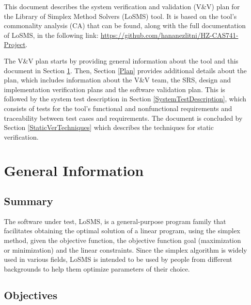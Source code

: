 \documentclass[12pt, titlepage]{article}
\newcommand{\famname}{LoSMS} %
\begin{document}
\listoffigures


\newpage


This document describes the system verification and validation (V\&V) plan for
the Library of Simplex Method Solvers (\famname{}) tool.   It is based on the tool's commonality analysis
(CA) that can be found, along with the full documentation of \famname{}, in the
following link: \url{https://github.com/hananezlitni/HZ-CAS741-Project}.

The V\&V plan starts by providing general information about the tool and this 
document in Section \ref{GeneralInfo}. Then, Section \ref{Plan} provides 
additional details about the plan, which includes information about the V\&V 
team, the SRS, design and implementation verification plans and the software 
validation plan. This is followed by the system test description in Section 
\ref{SystemTestDescription}, which consists of tests for the tool's functional 
and nonfunctional requirements and traceability between test cases and 
requirements. The document is concluded by Section \ref{StaticVerTechniques} 
which describes the techniques for static verification.

\section{General Information} \label{GeneralInfo}

\subsection{Summary}

The software under test, \famname{}, is a general-purpose program family that 
facilitates obtaining the optimal solution of a linear program, using the 
simplex method, given the objective function, the objective function goal 
(maximization or minimization) and the linear constraints. Since the simplex 
algorithm is widely used in various fields, \famname{} is intended to be used 
by people from different backgrounds to help them optimize parameters of their 
choice.

\subsection{Objectives}
\end{document}
